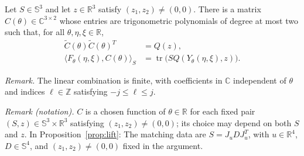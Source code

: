 \begin{lemma}\label{lem:matching}
Let $S\in\mathbb S^3$ and let $z\in\mathbb R^3$ satisfy
$(z_1,z_2)\ne(0,0)$.  There is a matrix
$C(\theta)\in\mathbb C^{3\times2}$ whose entries are trigonometric
polynomials of degree at most two such that, for all
$\theta,\eta,\xi\in\mathbb R$,
\begin{equation}\label{eq:matching}
 \begin{aligned}
 \widetilde C(\theta)\widetilde C(\theta)^T&=Q(z),\\
 \langle F_\theta(\eta,\xi),C(\theta)\rangle_S
 &=\operatorname{tr}\bigl(SQ(Y_\theta(\eta,\xi),z)\bigr).
 \end{aligned}
\end{equation}
\end{lemma}

\noindent\textit{Remark.} The linear combination is finite, with coefficients in $\mathbb C$ independent of $\theta$ and indices $\ell\in\mathbb Z$ satisfying $-j\leq\ell\leq j$.

\noindent\textit{Remark (notation).} $C$ is a chosen function of $\theta\in\mathbb R$ for each fixed pair $(S,z)\in\mathbb S^3\times\mathbb R^3$ satisfying $(z_1,z_2)\ne(0,0)$; its choice may depend on both $S$ and $z$. In Proposition~\ref{prop:lift}: The matching data are $S=J_uDJ_u^T$, with $u\in\mathbb R^4$, $D\in\mathbb S^4$, and $(z_1,z_2)\ne(0,0)$ fixed in the argument.


